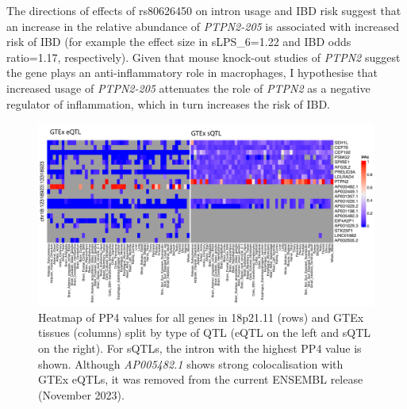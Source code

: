 The directions of effects of rs80626450 on intron usage and IBD risk suggest that an increase in the relative abundance of \textit{PTPN2-205} is associated with increased risk of IBD (for example the effect size in sLPS\_6=1.22  and IBD odds ratio=1.17, respectively). Given that mouse knock-out studies of \textit{PTPN2} suggest the gene plays an anti-inflammatory role in macrophages, I hypothesise that increased usage of \textit{PTPN2-205} attenuates the role of \textit{PTPN2} as a negative regulator of inflammation, which in turn increases the risk of IBD. 
\begin{figure}[H]
  \centering
  \includegraphics[width=1.0\textwidth]{ptpn2_gtex}
  \caption[Colocalisation of IBD-associated locus with \textit{PTPN2} QTLs in GTEx]{Heatmap of PP4 values for all genes in 18p21.11 (rows) and GTEx tissues (columns) split by type of QTL (eQTL on the left and sQTL on the right). For sQTLs, the intron with the highest PP4 value is shown. Although \textit{AP005482.1} shows strong colocalisation with GTEx eQTLs, it was removed from the current ENSEMBL release (November 2023).}
  \label{fig:ptpn2_gtex}   
\end{figure}
